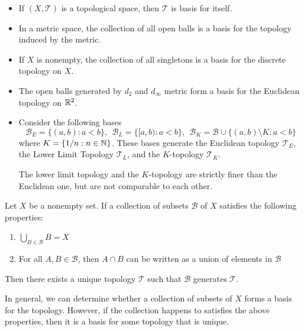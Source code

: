 \documentclass[a4paper]{article}
\begin{document}
\begin{eg}
\begin{itemize}
    \item If \( (X,\mathcal{T}) \) is a topological space, then \( \mathcal{T} \) is basis for itself.
    \item In a metric space, the collection of all open balls is a basis for the topology induced by the metric.
    \item If \( X  \) is nonempty, the collection of all singletons is a basis for the discrete topology on \( X  \).
    \item The open balls generated by \( {d}_{2} \) and \( {d}_{\infty } \) metric form a basis for the Euclidean topology on \( \mathbb{R}^{2} \).
    \item Consider the following bases
        \[  {\mathcal{B}}_{E} = \{ (a,b) : a < b  \}, \ \ {\mathcal{B}}_{L} = \{ [a,b) : a < b  \}, \ \ {\mathcal{B}}_{K} = \mathcal{B} \cup \{ (a,b) \setminus  K : a < b \}     \]
        where \( K = \{ 1/n : n \in \mathbb{N}  \}  \). These bases generate the Euclidean topology \( {\mathcal{T}}_{E} \), the Lower Limit Topology \( {\mathcal{T}}_{L} \), and the \( K \)-topology \( {\mathcal{T}}_{K} \).

        The lower limit topology and the \( K \)-topology are strictly finer than the Euclidean one, but are not comparable to each other.
\end{itemize}    
\end{eg}

\begin{remark}
   Let \( X  \) be a nonempty set. If a collection of subsets \( \mathcal{B} \) of \( X \) satisfies the following properties:
   \begin{enumerate}
       \item[(i)] \( \bigcup_{ B \in \mathcal{B} }^{  } B = X  \)
        \item[(ii)] For all \( A,B \in \mathcal{B} \), then \( A \cap B  \) can be written as a union of elements in \( \mathcal{B} \)
   \end{enumerate}
   Then there exists a unique topology \( \mathcal{T} \) such that \( \mathcal{B} \) generates \( \mathcal{T} \).
\end{remark}

\begin{remark}
    In general, we can determine whether a collection of subsets of \( X  \) forms a basis for the topology. However, if the collection happens to satisfies the above properties, then it is a basis for some topology that is unique.
\end{remark}
\end{document}
